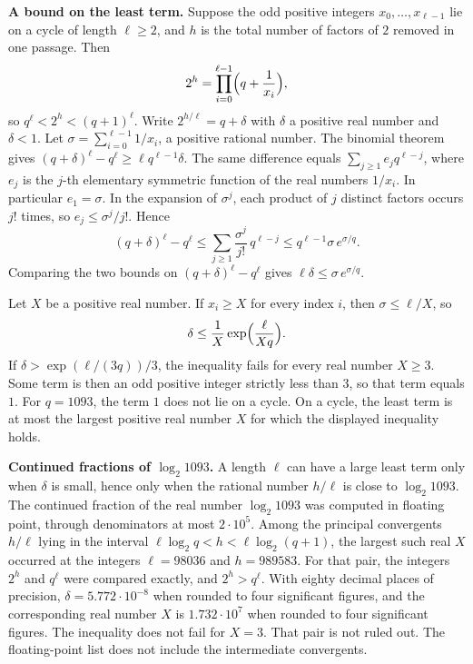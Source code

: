 \documentclass[11pt]{article}
\newcommand{\topic}[1]{\par\noindent\textbf{#1}}
\begin{document}
\topic{A bound on the least term.}
Suppose the odd positive integers \(x_0, \ldots, x_{\ell-1}\) lie on a cycle of length \(\ell \ge 2\), and \(h\) is the total number of factors of \(2\) removed in one passage.
Then
\[
2^h = \prod_{i=0}^{\ell-1}\Bigl(q + \frac{1}{x_i}\Bigr),
\]
so \(q^\ell < 2^h < (q+1)^\ell\).
Write \(2^{h/\ell} = q + \delta\) with \(\delta\) a positive real number and \(\delta < 1\).
Let \(\sigma = \sum_{i=0}^{\ell-1} 1/x_i\), a positive rational number.
The binomial theorem gives \((q+\delta)^\ell - q^\ell \ge \ell q^{\ell-1} \delta\).
The same difference equals \(\sum_{j \ge 1} e_j q^{\ell-j}\), where \(e_j\) is the \(j\)-th elementary symmetric function of the real numbers \(1/x_i\).
In particular \(e_1 = \sigma\).
In the expansion of \(\sigma^j\), each product of \(j\) distinct factors occurs \(j!\) times, so \(e_j \le \sigma^j/j!\).
Hence
\[
(q+\delta)^\ell - q^\ell \le \sum_{j \ge 1} \frac{\sigma^j}{j!}\, q^{\ell-j} \le q^{\ell-1} \sigma \, e^{\sigma/q}.
\]
Comparing the two bounds on \((q+\delta)^\ell - q^\ell\) gives \(\ell \delta \le \sigma \, e^{\sigma/q}\).

Let \(X\) be a positive real number.
If \(x_i \ge X\) for every index \(i\), then \(\sigma \le \ell/X\), so
\[
\delta \le \frac{1}{X} \exp\Bigl(\frac{\ell}{Xq}\Bigr).
\]
If \(\delta > \exp(\ell/(3q))/3\), the inequality fails for every real number \(X \ge 3\).
Some term is then an odd positive integer strictly less than \(3\), so that term equals \(1\).
For \(q = 1093\), the term \(1\) does not lie on a cycle.
On a cycle, the least term is at most the largest positive real number \(X\) for which the displayed inequality holds.

\topic{Continued fractions of \(\log_2 1093\).}
A length \(\ell\) can have a large least term only when \(\delta\) is small, hence only when the rational number \(h/\ell\) is close to \(\log_2 1093\).
The continued fraction of the real number \(\log_2 1093\) was computed in floating point, through denominators at most \(2 \cdot 10^5\).
Among the principal convergents \(h/\ell\) lying in the interval \(\ell \log_2 q < h < \ell \log_2(q+1)\), the largest such real \(X\) occurred at the integers \(\ell = 98036\) and \(h = 989583\).
For that pair, the integers \(2^h\) and \(q^\ell\) were compared exactly, and \(2^h > q^\ell\).
With eighty decimal places of precision, \(\delta = 5.772 \cdot 10^{-8}\) when rounded to four significant figures, and the corresponding real number \(X\) is \(1.732 \cdot 10^{7}\) when rounded to four significant figures.
The inequality does not fail for \(X = 3\).
That pair is not ruled out.
The floating-point list does not include the intermediate convergents.
\end{document}
